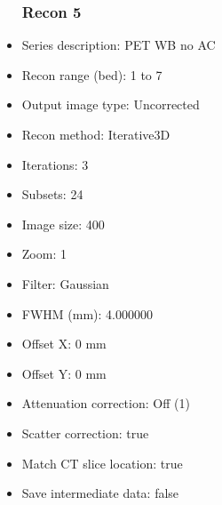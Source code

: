 \documentclass[12pt]{article}
\begin{document}
\begin{itemize}
\subsubsection{Recon 5}
\item Series description: PET WB no AC
\item Recon range (bed): 1 to 7
\item Output image type: Uncorrected
\item Recon method: Iterative3D
\item Iterations: 3
\item Subsets: 24
\item Image size: 400
\item Zoom: 1
\item Filter: Gaussian
\item FWHM (mm): 4.000000
\item Offset X: 0 mm
\item Offset Y: 0 mm
\item Attenuation correction: Off (1)
\item Scatter correction: true
\item Match CT slice location: true
\item Save intermediate data: false
\end{itemize}
\end{document}
